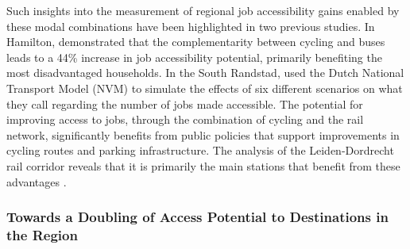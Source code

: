 \begin{refsegment}
Such insights into the measurement of regional job accessibility gains enabled by these modal combinations have been highlighted in two previous studies. In Hamilton, \textcolor{blue}{\textcite[10]{zuo_first-and-last_2020}} demonstrated that the complementarity between cycling and buses leads to a 44\% increase in job accessibility potential, primarily benefiting the most disadvantaged households. In the South Randstad, \textcolor{blue}{\textcite[4-7]{geurs_multi-modal_2016}} used the Dutch National Transport Model (NVM) to simulate the effects of six different scenarios on what they call  regarding the number of jobs made accessible. The potential for improving access to jobs, through the combination of cycling and the rail network, significantly benefits from public policies that support improvements in cycling routes and parking infrastructure. The analysis of the Leiden-Dordrecht rail corridor reveals that it is primarily the main stations that benefit from these advantages \textcolor{blue}{\autocite[11]{geurs_multi-modal_2016}}.%

\subsubsection*{Towards a Doubling of Access Potential to Destinations in the Region
    \label{chap5:potentiel-accessibilite-destinations}
}


\end{refsegment}
